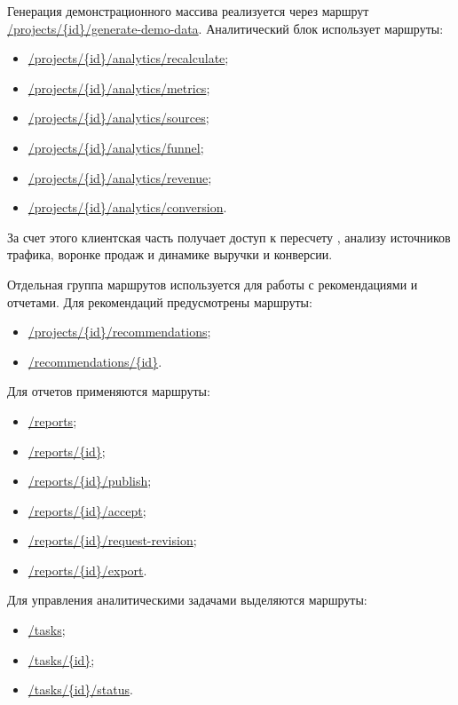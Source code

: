 Генерация демонстрационного массива реализуется через маршрут \url{/projects/\{id\}/generate-demo-data}. Аналитический блок использует маршруты:
\begin{itemize}[leftmargin=1.25cm]
    \item \url{/projects/\{id\}/analytics/recalculate};
    \item \url{/projects/\{id\}/analytics/metrics};
    \item \url{/projects/\{id\}/analytics/sources};
    \item \url{/projects/\{id\}/analytics/funnel};
    \item \url{/projects/\{id\}/analytics/revenue};
    \item \url{/projects/\{id\}/analytics/conversion}.
\end{itemize}

За счет этого клиентская часть получает доступ к пересчету , анализу источников трафика, воронке продаж и динамике выручки и конверсии.

Отдельная группа маршрутов используется для работы с рекомендациями и отчетами. Для рекомендаций предусмотрены маршруты:
\begin{itemize}[leftmargin=1.25cm]
    \item \url{/projects/\{id\}/recommendations};
    \item \url{/recommendations/\{id\}}.
\end{itemize}

Для отчетов применяются маршруты:
\begin{itemize}[leftmargin=1.25cm]
    \item \url{/reports};
    \item \url{/reports/\{id\}};
    \item \url{/reports/\{id\}/publish};
    \item \url{/reports/\{id\}/accept};
    \item \url{/reports/\{id\}/request-revision};
    \item \url{/reports/\{id\}/export}.
\end{itemize}

Для управления аналитическими задачами выделяются маршруты:
\begin{itemize}[leftmargin=1.25cm]
    \item \url{/tasks};
    \item \url{/tasks/\{id\}};
    \item \url{/tasks/\{id\}/status}.
\end{itemize}

